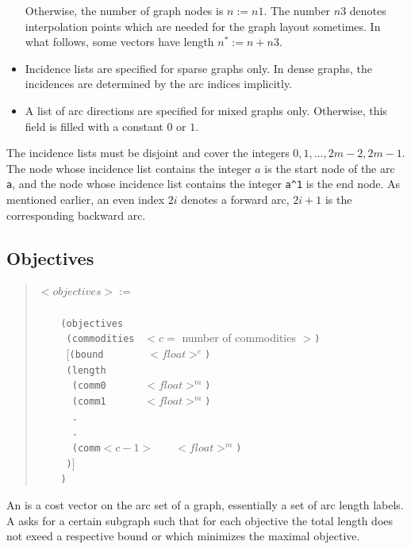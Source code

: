 \documentclass[a4paper,11pt,twoside]{book}
\begin{document}
\begin{multicols}{2}
\begin{itemize}
    Otherwise, the number of graph nodes is $n:=n1$. The number $n3$ denotes
    interpolation points which are needed for the graph layout sometimes.
    In what follows, some vectors have length $n^*:=n+n3$.
\item Incidence lists are specified for sparse graphs only. In dense graphs,
    the incidences are determined by the arc indices implicitly.
\item A list of arc directions are specified for mixed graphs only.
    Otherwise, this field is filled with a constant $0$ or $1$.
\end{itemize}
The incidence lists must be disjoint and cover the integers
$0,1,\dots,2m-2,2m-1$. The node whose incidence list contains the integer
$a$ is the start node of the arc \verb/a/, and the node whose incidence list
contains the integer \verb/a^1/ is the end node. As mentioned earlier, an even
index $2i$ denotes a forward arc, $2i+1$ is the corresponding backward arc.


\newpage
\subsection{Objectives}
\begin{quote}
$<objectives> :=$\verb/    /\\
\verb/    /\\
\verb/    (objectives/\\
\verb/     (commodities / $<c=$ number of commodities $>$\verb/)/\\
\verb/     /$[$\verb/(bound       / $<float>^c$\verb/)/\\
\verb/     (length/\\
\verb/      (comm0      / $<float>^m$\verb/)/\\
\verb/      (comm1      / $<float>^m$\verb/)/\\
\verb/      ./\\
\verb/      ./\\
\verb/      (comm/$<c-1>$\verb/   / $<float>^m$\verb/)/\\
\verb/     )/$]$\\
\verb/    )/\\
\end{quote}
An  is a cost vector on the arc set of a graph,
essentially a set of arc length labels. A
asks for a certain subgraph such that for each objective the total length does
not exeed a respective bound or which minimizes the maximal objective.


\end{multicols}
\end{document}
